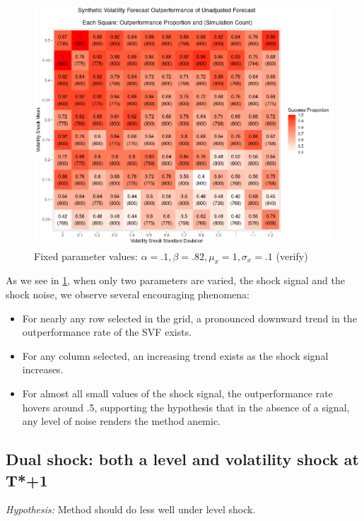 \documentclass[11pt]{article}
\theoremstyle{definition}
\begin{document}
\begin{figure}[h!]
\begin{center}
  \includegraphics[scale=.45]{simulation_plots/outperformance_grid.png}
  \caption{Fixed parameter values: $\alpha = .1, \beta = .82, \mu_{x} = 1, \sigma_{x} = .1$ (verify)}
  \label{fig:outperformance}
\end{center}
\end{figure}

As we see in \ref{fig:outperformance}, when only two parameters are varied, the shock signal and the shock noise, we observe several encouraging phenomena:
\begin{itemize}
\item For nearly any row selected in the grid, a pronounced downward trend in the outperformance rate of the SVF exists.
\item For any column selected, an increasing trend exists as the shock signal increases.
\item For almost all small values of the shock signal, the outperformance rate hovers around .5, supporting the hypothesis that in the absence of a signal, any level of noise renders the method anemic.
\end{itemize}



\subsection{Dual shock: both a level and volatility shock at T*+1}
\textit{Hypothesis:} Method should do less well under level shock.
\end{document}
